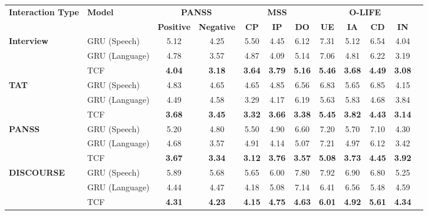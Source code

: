 \documentclass[9pt,a4paper]{rho-class/rho}
\begin{document}
\begin{table*}[htbp]
\centering
{}  %
\begin{tabularx}{\textwidth}{>{\raggedright\arraybackslash}X | l | c | c | c | c | c | c | c | c | c | c }
\toprule
\textbf{Interaction Type} & \textbf{Model} & \multicolumn{2}{c}{\textbf{PANSS}} & \multicolumn{3}{c}{\textbf{MSS}} & \multicolumn{4}{c}{\textbf{O-LIFE}} \\
                          &                & \textbf{Positive} & \textbf{Negative} & \textbf{CP} & \textbf{IP} & \textbf{DO} & \textbf{UE} & \textbf{IA} & \textbf{CD} & \textbf{IN} \\
\midrule
\textbf{Interview} & GRU (Speech)     & 5.12 & 4.25 & 5.50 & 4.45 & 6.12 & 7.31 & 5.12 & 6.54 & 4.04 \\
                      & GRU (Language)   & 4.78 & 3.57 & 4.87 & 4.09 & 5.14 & 7.06 & 4.81 & 6.22 & 3.19 \\
                      & TCF       & \textbf{4.04} & \textbf{3.18} & \textbf{3.64} & \textbf{3.79} & \textbf{5.16} & \textbf{5.46} & \textbf{3.68} & \textbf{4.49} & \textbf{3.08} \\
\midrule
\textbf{TAT} & GRU (Speech)     & 4.83 & 4.65 & 4.65 & 4.85 & 6.56 & 6.83 & 5.65 & 6.85 & 4.15 \\
                          & GRU (Language)   & 4.49 & 4.58 & 3.29 & 4.17 & 6.19 & 5.63 & 5.83 & 4.68 & 3.84 \\
                          & TCF       & \textbf{3.68} & \textbf{3.45} & \textbf{3.32} & \textbf{3.66} & \textbf{3.38} & \textbf{5.45} & \textbf{3.82} & \textbf{4.43} & \textbf{3.14} \\
\midrule
\textbf{PANSS} & GRU (Speech)     & 5.20 & 4.80 & 5.50 & 4.90 & 6.60 & 7.20 & 5.70 & 7.10 & 4.30 \\
               & GRU (Language)   & 4.68 & 3.57 & 4.91 & 4.14 & 5.07 & 7.21 & 4.97 & 6.12 & 3.42 \\
               & TCF       & \textbf{3.67} & \textbf{3.34} & \textbf{3.12} & \textbf{3.76} & \textbf{3.57} & \textbf{5.08} & \textbf{3.73} & \textbf{4.45} & \textbf{3.92} \\
\midrule
\textbf{DISCOURSE} & GRU (Speech)     & 5.89 & 5.68 & 5.65 & 6.00 & 7.80 & 7.92 & 6.90 & 6.80 & 5.25 \\
                  & GRU (Language)   & 4.44 & 4.47 & 4.18 & 5.08 & 7.14 & 6.41 & 6.56 & 5.48 & 4.59 \\
                  & TCF       & \textbf{4.31} & \textbf{4.23} & \textbf{4.15} & \textbf{4.75} & \textbf{4.63} & \textbf{6.01} & \textbf{4.92} & \textbf{5.61} & \textbf{4.34} \\

\end{tabularx}
\end{table*}
\end{document}
